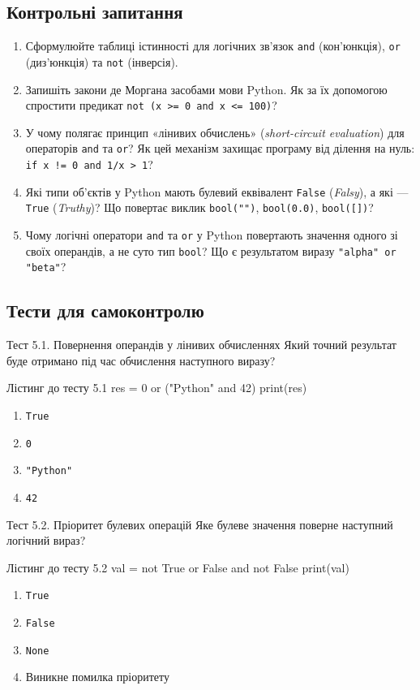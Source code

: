 \subsection*{Контрольні запитання}
\begin{enumerate}[label=\textbf{5.\arabic*.}]
	\item Сформулюйте таблиці істинності для логічних зв'язок \texttt{and} (кон'юнкція), \texttt{or} (диз'юнкція) та \texttt{not} (інверсія).
	\item Запишіть закони де Моргана засобами мови Python. Як за їх допомогою спростити предикат \texttt{not (x >= 0 and x <= 100)}?
	\item У чому полягає принцип «лінивих обчислень» (\textit{short-circuit evaluation}) для операторів \texttt{and} та \texttt{or}? Як цей механізм захищає програму від ділення на нуль: \texttt{if x != 0 and 1/x > 1}?
	\item Які типи об'єктів у Python мають булевий еквівалент \texttt{False} (\textit{Falsy}), а які --- \texttt{True} (\textit{Truthy})? Що повертає виклик \texttt{bool("")}, \texttt{bool(0.0)}, \texttt{bool([])}?
	\item Чому логічні оператори \texttt{and} та \texttt{or} у Python повертають значення одного зі своїх операндів, а не суто тип \texttt{bool}? Що є результатом виразу \texttt{"alpha" or "beta"}?
\end{enumerate}

\subsection*{Тести для самоконтролю}

\begin{pr}{Тест 5.1. Повернення операндів у лінивих обчисленнях}
Який точний результат буде отримано під час обчислення наступного виразу?
\begin{py}{Лістинг до тесту 5.1}
res = 0 or ("Python" and 42)
print(res)
\end{py}
\begin{enumerate}[label=\textbf{\Alph*.}]
	\item \texttt{True}
	\item \texttt{0}
	\item \texttt{"Python"}
	\item \texttt{42}
\end{enumerate}
\end{pr}

\begin{pr}{Тест 5.2. Пріоритет булевих операцій}
Яке булеве значення поверне наступний логічний вираз?
\begin{py}{Лістинг до тесту 5.2}
val = not True or False and not False
print(val)
\end{py}
\begin{enumerate}[label=\textbf{\Alph*.}]
	\item \texttt{True}
	\item \texttt{False}
	\item \texttt{None}
	\item Виникне помилка пріоритету
\end{enumerate}
\end{pr}

